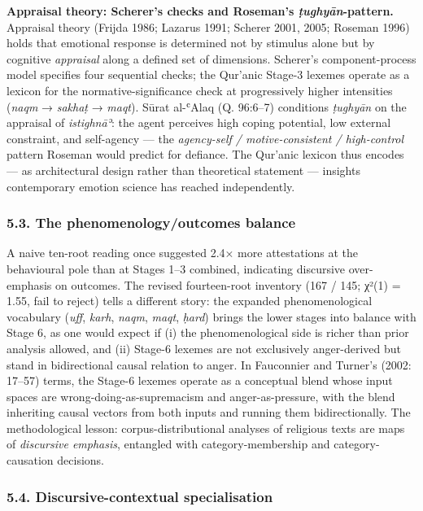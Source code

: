 \textbf{Appraisal theory: Scherer's checks and Roseman's
\emph{ṭughyān}-pattern.} Appraisal theory (Frijda 1986; Lazarus 1991;
Scherer 2001, 2005; Roseman 1996) holds that emotional response is
determined not by stimulus alone but by cognitive \emph{appraisal} along
a defined set of dimensions. Scherer's component-process model specifies
four sequential checks; the Qur'anic Stage-3 lexemes operate as a
lexicon for the normative-significance check at progressively higher
intensities (\emph{naqm} → \emph{sakhaṭ} → \emph{maqt}). Sūrat al-ʿAlaq
(Q. 96:6--7) conditions \emph{ṭughyān} on the appraisal of
\emph{istighnāʾ}: the agent perceives high coping potential, low
external constraint, and self-agency --- the \emph{agency-self /
motive-consistent / high-control} pattern Roseman would predict for
defiance. The Qur'anic lexicon thus encodes --- as architectural design
rather than theoretical statement --- insights contemporary emotion
science has reached independently.

\subsubsection{5.3. The phenomenology/outcomes
balance}\label{the-phenomenologyoutcomes-balance}

A naive ten-root reading once suggested 2.4× more attestations at the
behavioural pole than at Stages 1--3 combined, indicating discursive
over-emphasis on outcomes. The revised fourteen-root inventory (167 /
145; χ²(1) = 1.55, fail to reject) tells a different story: the expanded
phenomenological vocabulary (\emph{uff}, \emph{karh}, \emph{naqm},
\emph{maqt}, \emph{ḥard}) brings the lower stages into balance with
Stage 6, as one would expect if (i) the phenomenological side is richer
than prior analysis allowed, and (ii) Stage-6 lexemes are not
exclusively anger-derived but stand in bidirectional causal relation to
anger. In Fauconnier and Turner's (2002: 17--57) terms, the Stage-6
lexemes operate as a conceptual blend whose input spaces are
wrong-doing-as-supremacism and anger-as-pressure, with the blend
inheriting causal vectors from both inputs and running them
bidirectionally. The methodological lesson: corpus-distributional
analyses of religious texts are maps of \emph{discursive emphasis},
entangled with category-membership and category-causation decisions.

\subsubsection{5.4. Discursive-contextual
specialisation}\label{discursive-contextual-specialisation}

